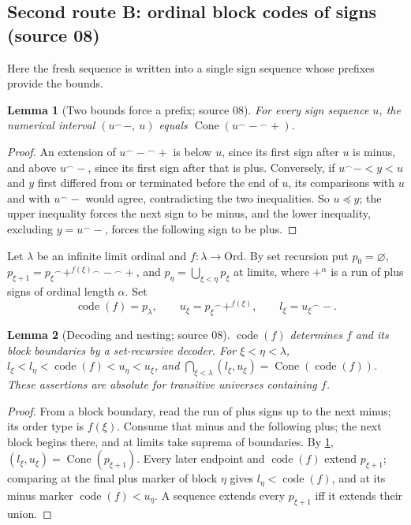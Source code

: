 \documentclass[11pt,letterpaper]{article}
\numberwithin{equation}{section}
\newtheorem{lemma}[lemma]{Lemma}
\theoremstyle{definition}
\theoremstyle{remark}
\newcommand{\Ord}{\mathrm{Ord}}
\newcommand{\Cone}{\operatorname{Cone}}
\newcommand{\code}{\operatorname{code}}
\newcommand{\cat}{\mathbin{{}^{\frown}}}
\begin{document}
\subsection{Second route B: ordinal block codes of signs (source 08)}\label{univ:sub:blockcode}

Here the fresh sequence is written into a single sign sequence whose prefixes
provide the bounds.

\begin{lemma}[Two bounds force a prefix; source 08]\label{univ:lem:twobounds}
For every sign sequence $u$, the numerical interval $(u\cat-,\ u)$ equals
$\Cone(u\cat-\cat+)$.
\end{lemma}
\begin{proof}
An extension of $u\cat-\cat+$ is below $u$, since its first sign after $u$ is
minus, and above $u\cat-$, since its first sign after that is plus.
Conversely, if $u\cat-<y<u$ and $y$ first differed from or terminated before
the end of $u$, its comparisons with $u$ and with $u\cat-$ would agree,
contradicting the two inequalities. So $u\preceq y$; the upper inequality
forces the next sign to be minus, and the lower inequality, excluding
$y=u\cat-$, forces the following sign to be plus.
\end{proof}

Let $\lambda$ be an infinite limit ordinal and $f:\lambda\to\Ord$. By set
recursion put $p_0=\varnothing$, $p_{\xi+1}=p_\xi\cat+^{f(\xi)}\cat-\cat+$, and
$p_\eta=\bigcup_{\xi<\eta}p_\xi$ at limits, where $+^\alpha$ is a run of plus
signs of ordinal length $\alpha$. Set
\begin{equation}\label{univ:eq:blockendpoints}
 \code(f)=p_\lambda,\qquad
 u_\xi=p_\xi\cat+^{f(\xi)},\qquad
 l_\xi=u_\xi\cat-.
\end{equation}

\begin{lemma}[Decoding and nesting; source 08]\label{univ:lem:blockdecode}
$\code(f)$ determines $f$ and its block boundaries by a set-recursive
decoder. For $\xi<\eta<\lambda$,
$l_\xi<l_\eta<\code(f)<u_\eta<u_\xi$, and
$\bigcap_{\xi<\lambda}(l_\xi,u_\xi)=\Cone(\code(f))$. These assertions are
absolute for transitive universes containing $f$.
\end{lemma}
\begin{proof}
From a block boundary, read the run of plus signs up to the next minus; its
order type is $f(\xi)$. Consume that minus and the following plus; the next
block begins there, and at limits take suprema of boundaries. By
\cref{univ:lem:twobounds}, $(l_\xi,u_\xi)=\Cone(p_{\xi+1})$. Every later
endpoint and $\code(f)$ extend $p_{\xi+1}$; comparing at the final plus marker
of block $\eta$ gives $l_\eta<\code(f)$, and at its minus marker
$\code(f)<u_\eta$. A sequence extends every $p_{\xi+1}$ iff it extends their
union.
\end{proof}
\end{document}
